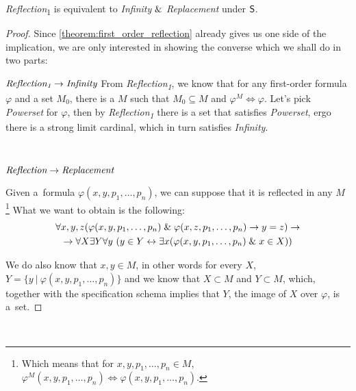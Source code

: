 \begin{theorem}\label{theorem:levy_equivalence_contemporary}
\emph{Reflection}\textsubscript{1} is equivalent to \emph{Infinity} $ \mathrel{\&} $ \emph{Replacement} under $\sf{S}$.
\end{theorem}
\begin{proof}
Since \ref{theorem:first_order_reflection} already gives us one side of the implication, we are only interested in showing the converse which we shall do in two parts:

$\bold{\emph{Reflection\textsubscript{1}} \rightarrow \emph{Infinity}}$
From \emph{Reflection\textsubscript{1}}, we know that for any first-order formula $\varphi$ and a set $M_0$, there is a $M$ such that $M_0 \subseteq M$ and $\varphi^M \iff \varphi$. Let's pick \emph{Powerset} for $\varphi$, then by \emph{Reflection\textsubscript{1}} there is a set that satisfies \emph{Powerset}, ergo there is a strong limit cardinal, which in turn satisfies \emph{Infinity}.

\

$\bold{\emph{Reflection} \rightarrow \emph{Replacement}}$

Given a~formula $\varphi(x, y, p_1, \ldots, p_n)$, we can suppose that it is reflected in any $M$ \footnote{Which means that for $x, y, p_1, \ldots, p_n \in M$, $\varphi^M(x, y, p_1, \ldots, p_n) \iff \varphi(x, y, p_1, \ldots, p_n)$.}
What we want to obtain is the following:
\begin{equation}
\begin{gathered}
\forall x, y, z (\varphi(x, y, p_1, \ldots, p_n) \mathrel{\&} \varphi(x, z, p_1, \ldots, p_n) \rightarrow y = z) \rightarrow\\
\rightarrow \forall X \exists Y \forall y\ (y \in Y \leftrightarrow \exists x (\varphi(x, y, p_1, \ldots, p_n) \mathrel{\&} x \in X ))
\end{gathered}
\end{equation}

We do also know that $x, y \in M$, in other words for every $X$, $Y = \{y\ |\ \varphi(x, y, p_1, \ldots, p_n)\}$ and we know that $X \subset M$ and $Y \subset M$, which, together with the specification schema implies that $Y$, the image of $X$ over $\varphi$, is a~set.
\end{proof}

\

